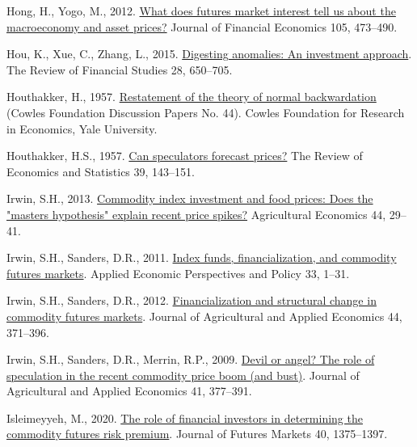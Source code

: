 \documentclass[]{elsarticle} %
\newlength{\cslhangindent}
\newlength{\cslentryspacingunit} %
\newenvironment{CSLReferences}[2] %
 {%
  \setlength{\parindent}{0pt}
  \ifodd #1
  \let\oldpar\par
  \def\par{\hangindent=\cslhangindent\oldpar}
  \fi
  \setlength{\parskip}{#2\cslentryspacingunit}
 }%
 {}
\begin{document}
\begin{CSLReferences}{1}{0}
\leavevmode{}%
Hong, H., Yogo, M., 2012. \href{https://doi.org/10.1016/j.jfineco.2012.04.005}{What does futures market interest tell us about the macroeconomy and asset prices?} Journal of Financial Economics 105, 473--490.

\leavevmode{}%
Hou, K., Xue, C., Zhang, L., 2015. \href{https://doi.org/10.1093/rfs/hhu068}{Digesting anomalies: An investment approach}. The Review of Financial Studies 28, 650--705.

\leavevmode{}%
Houthakker, H., 1957. \href{https://EconPapers.repec.org/RePEc:cwl:cwldpp:44}{Restatement of the theory of normal backwardation} (Cowles Foundation Discussion Papers No. 44). Cowles Foundation for Research in Economics, Yale University.

\leavevmode{}%
Houthakker, H.S., 1957. \href{https://doi.org/10.2307/1928531}{Can speculators forecast prices?} The Review of Economics and Statistics 39, 143--151.

\leavevmode{}%
Irwin, S.H., 2013. \href{https://doi.org/10.1111/agec.12048}{Commodity index investment and food prices: Does the "masters hypothesis" explain recent price spikes?} Agricultural Economics 44, 29--41.

\leavevmode{}%
Irwin, S.H., Sanders, D.R., 2011. \href{https://doi.org/10.1093/aepp/ppq032}{Index funds, financialization, and commodity futures markets}. Applied Economic Perspectives and Policy 33, 1--31.

\leavevmode{}%
Irwin, S.H., Sanders, D.R., 2012. \href{https://doi.org/10.1017/s1074070800000481}{Financialization and structural change in commodity futures markets}. Journal of Agricultural and Applied Economics 44, 371--396.

\leavevmode{}%
Irwin, S.H., Sanders, D.R., Merrin, R.P., 2009. \href{https://doi.org/10.1017/s1074070800002856}{Devil or angel? The role of speculation in the recent commodity price boom (and bust)}. Journal of Agricultural and Applied Economics 41, 377--391.

\leavevmode{}%
Isleimeyyeh, M., 2020. \href{https://doi.org/10.1002/fut.22122}{The role of financial investors in determining the commodity futures risk premium}. Journal of Futures Markets 40, 1375--1397.


\end{CSLReferences}
\end{document}
